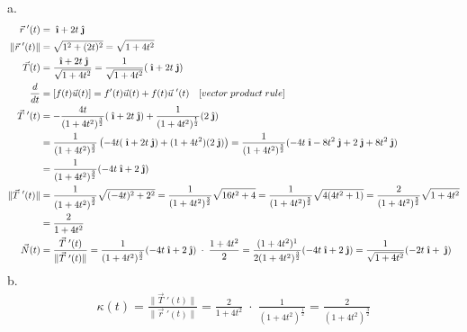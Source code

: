 \documentclass{article}
\newcommand{\ihat}{\;\hat{\textbf{\i}}}
\newcommand{\jhat}{\;\hat{\textbf{\j}}}
\newcommand{\drvec}{\vec{r}\;'(t)}
\begin{document}
a. 
\begin{align*}
    \drvec &=  \ihat +  2t\jhat \\ 
    \|\drvec\| &= \sqrt{1^2 + (2t)^2} = \sqrt{1 + 4t^2}  \\
    \vec T (t) &=  \frac{\ihat + 2t\jhat}{\sqrt{1 + 4t^2}} = \frac{1}{\sqrt{1 + 4t^2}}(\ihat + 2t\jhat) \\
    \frac{d}{dt} &= [f(t)\vec u (t)] = f'(t)\vec u (t) + f(t)\vec u \;'(t) \quad [vector\;product\;rule] \\  
    \vec T \;'(t) &= -\frac{4t}{(1+4t^2)^{\frac 3 2}}(\ihat + 2t\jhat) + \frac{1}{(1 + 4t^2)^{\frac 1 2}}(2\jhat) \\
                  &= \frac{1}{(1 + 4t^2)^{\frac 3 2}}\left(-4t(\ihat + 2t\jhat) + (1+4t^2)(2\jhat)\right) = \frac{1}{(1 + 4t^2)^{\frac 3 2}}(-4t\ihat - 8t^2\jhat + 2\jhat + 8t^2\jhat) \\
                  &= \frac{1}{(1 + 4t^2)^{\frac 3 2}}(-4t\ihat + 2\jhat) \\
    \| \vec T \;'(t)\| &= \frac{1}{\left(1+4t^2\right)^{\frac 3 2}}\sqrt{(-4t)^2 + 2^2} = \frac{1}{(1 + 4t^2)^{\frac 3 2}} \sqrt{16t^2 + 4} = \frac{1}{(1 + 4t^2)^{\frac 3 2}}\sqrt{4(4t^2 + 1)} = \frac{2}{(1 + 4t^2)^{\frac 3 2}}\sqrt{1+4t^2} \\
                       &= \frac{2}{1+4t^2} \\
    \vec N (t) &=  \frac{\vec T\;'(t)}{\|\vec T\;'(t)\|} = \frac{1}{(1+4t^2)^{\frac 3 2}}(-4t\ihat + 2\jhat) \; \cdot \; \frac{1+4t^2}{2} = \frac{(1+4t^2)^1}{2(1+4t^2)^{\frac 3 2}}(-4t\ihat + 2\jhat) = \frac{1}{\sqrt{1+4t^2}}(-2t\ihat + \jhat)
\end{align*}
b.
\begin{align*}
    \kappa (t) = \frac{\|\vec T\;'(t)\|}{\|\drvec\|} = \frac{2}{1+4t^2} \;\cdot\; \frac{1}{(1+4t^2)^\frac 1 2} = \frac{2}{(1+4t^2)^{\frac 3 2}}
\end{align*}
\end{document}
